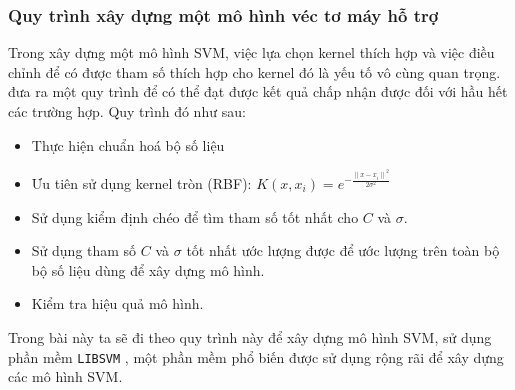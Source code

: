\subsubsection{Quy trình xây dựng một mô hình véc tơ máy hỗ trợ}

Trong xây dựng một mô hình SVM, việc lựa chọn kernel thích hợp và việc điều chỉnh để có được tham số thích hợp cho kernel đó là yếu tố vô cùng quan trọng. 
\textcite{hsu2003practical} đưa ra một quy trình để có thể đạt được kết quả chấp nhận được đối với hầu hết các trường hợp. Quy trình đó như sau:

\begin{itemize}
  \item Thực hiện chuẩn hoá bộ số liệu
  \item Ưu tiên sử dụng kernel tròn (RBF): $K(x, x_i) = e^{-\frac{{\|x - x_i\|}^2}{2 \sigma^2}}$
  \item Sử dụng kiểm định chéo để tìm tham số tốt nhất cho $C$ và $\sigma$.
  \item Sử dụng tham số $C$ và $\sigma$ tốt nhất ước lượng được để ước lượng trên toàn bộ bộ số liệu dùng để xây dựng mô hình.
  \item Kiểm tra hiệu quả mô hình.
\end{itemize}

Trong bài này ta sẽ đi theo quy trình này để xây dựng mô hình SVM, sử dụng phần mềm \texttt{LIBSVM} \textcite{CC01a}, một phần mềm phổ biến được sử dụng rộng rãi để xây dựng các mô hình SVM.
